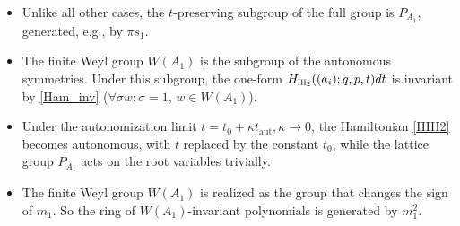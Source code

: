 \documentclass[12pt,a4paper]{article}
\numberwithin{equation}{section}
\newcommand{\III}{\scalebox{.6}{III}}
\begin{document}
\begin{itemize}
    \item Unlike all other cases, the $t$-preserving subgroup of the full group is $P_{A_1}$, generated, e.g., by $\pi s_1$.
    \item The finite Weyl group $W(A_1)$ is the subgroup of the autonomous symmetries. Under this subgroup, the one-form $H_{\III_2}((a_i);q,p,t)dt$ is invariant by \eqref{Ham_inv} ($\forall\sigma w: \sigma=1, \, w\in W(A_1)$).
    \item  Under the autonomization limit $t=t_0+\kappa t_{\textrm{aut}}, \kappa\rightarrow0$, the Hamiltonian \eqref{HIII2} becomes autonomous, with $t$ replaced by the constant $t_0$, while the lattice group $P_{A_1}$ acts on the root variables trivially. 
    \item The finite Weyl group $W(A_1)$ is realized as the group that changes the sign of $m_1$. So the ring of $W(A_1)$-invariant polynomials is generated by $m_1^2$.
\end{itemize}
\end{document}
